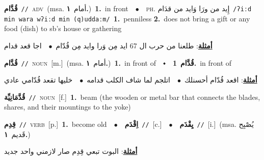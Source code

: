 \documentclass[10pt,a4paper,twoside]{article} %
\begin{document}
\begin{multicols}{2}
{\setlength\topsep{0pt}\textbf{\foreignlanguage{arabic}{قُدَّام}}\ {\color{gray}\texttt{//}\color{black}}\ \textsc{adv}\ \color{gray}(msa. \foreignlanguage{arabic}{أمام}~\foreignlanguage{arabic}{\textbf{١.}})\color{black}\ \textbf{1.}~in front\ \ $\bullet$\ \ \textsc{ph.} \color{gray} \foreignlanguage{arabic}{إِيد من ورَا وَايد من قدَام}\color{black}\ {\color{gray}\texttt{/{\sffamily ʔiːd min wara wʔiːd min (q)uddaːm}/}\color{black}}\ \textbf{1.}~penniless  \textbf{2.}~does not bring a gift or any food (dish) to sb's house or gathering\  \begin{flushright}\color{gray}\foreignlanguage{arabic}{\textbf{\underline{\foreignlanguage{arabic}{أمثلة}}}: طلعنا من حرب ال 67 ايد مِن وَرا وايد مِن قُدّام\ $\bullet$\ \  اجا قعد قدام}\end{flushright}\color{black}} \vspace{2mm}

{\setlength\topsep{0pt}\textbf{\foreignlanguage{arabic}{قُدَّام}}\ {\color{gray}\texttt{//}\color{black}}\ \textsc{noun}\ [m.]\ \color{gray}(msa. \foreignlanguage{arabic}{أمام}~\foreignlanguage{arabic}{\textbf{١.}})\color{black}\ \textbf{1.}~in front of\ \ $\smblkdiamond$\ \ \setlength\topsep{0pt}\textbf{\foreignlanguage{arabic}{قُدَّام}}\ \textbf{1.}~in front of\  \begin{flushright}\color{gray}\foreignlanguage{arabic}{\textbf{\underline{\foreignlanguage{arabic}{أمثلة}}}: اقعد قُدّام أحسنلك\ $\bullet$\ \  اتلجم لما شاف الكلب قدامه\ $\bullet$\ \  خليها تقعد قُدّامي عادي}\end{flushright}\color{black}} \vspace{2mm}

{\setlength\topsep{0pt}\textbf{\foreignlanguage{arabic}{قُدَّمَانِيِّة}}\ {\color{gray}\texttt{//}\color{black}}\ \textsc{noun}\ [f.]\ \textbf{1.}~beam (the wooden or metal bar that connects the blades, shares, and their mountings to the yoke)\ } \vspace{2mm}

{\setlength\topsep{0pt}\textbf{\foreignlanguage{arabic}{قِدِم}}\ {\color{gray}\texttt{//}\color{black}}\ \textsc{verb}\ [p.]\ \textbf{1.}~become old\ \ $\bullet$\ \ \setlength\topsep{0pt}\textbf{\foreignlanguage{arabic}{اِقْدَم}}\ {\color{gray}\texttt{//}\color{black}}\ [c.]\ \ $\bullet$\ \ \setlength\topsep{0pt}\textbf{\foreignlanguage{arabic}{يِقْدَم}}\ {\color{gray}\texttt{//}\color{black}}\ [i.]\ \color{gray}(msa. \foreignlanguage{arabic}{يُصْبِح قَديم}~\foreignlanguage{arabic}{\textbf{١.}})\color{black}\  \begin{flushright}\color{gray}\foreignlanguage{arabic}{\textbf{\underline{\foreignlanguage{arabic}{أمثلة}}}: البوت تبعي قِدِم صار لازمني واحد جديد}\end{flushright}\color{black}} \vspace{2mm}


\end{multicols}
\end{document}
